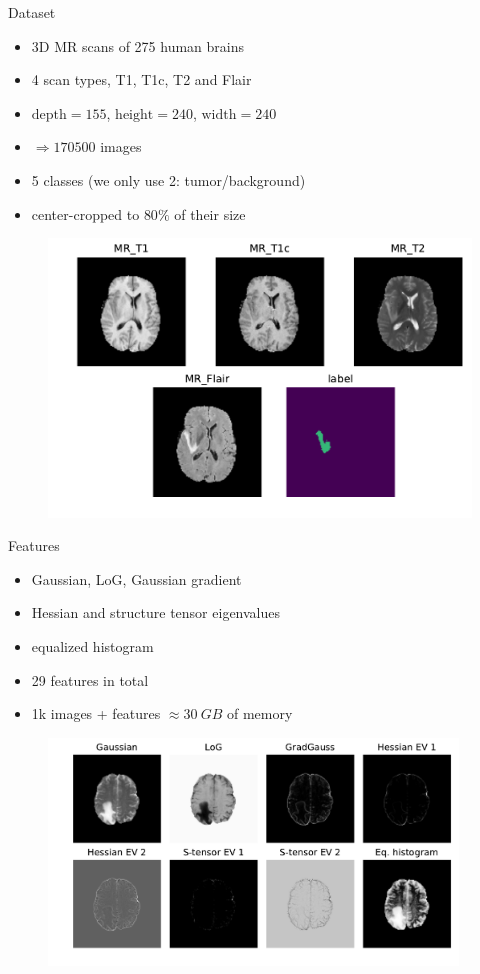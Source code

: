 \documentclass[final]{beamer}
\newlength{\onecolwid}
\begin{document}
\begin{frame}[t]
\begin{columns}[t]
\begin{column}{\onecolwid}
\begin{alertblock}{Dataset}
\begin{itemize}[label={}]
\item 3D MR scans of 275 human brains
\item 4 scan types, T1, T1c, T2 and Flair
\item $\mathrm{depth}=155$, $\mathrm{height}=240$, $\mathrm{width}=240$
\item $\Rightarrow 170500$ images
\item 5 classes (we only use 2: tumor/background)
\item center-cropped to $80\%$ of their size
\end{itemize}
\begin{figure}
\includegraphics[width=0.9\linewidth]{scan_types_trans}
\end{figure}

\end{alertblock}

\begin{block}{Features}
\begin{itemize}[label={}]
\item Gaussian, LoG, Gaussian gradient
\item Hessian and structure tensor eigenvalues
\item equalized histogram
\item 29 features in total
\item 1k images + features $\approx \SI{30}{GB}$ of memory
\end{itemize}
\begin{figure}
\includegraphics[width=0.97\textwidth]{features}
\end{figure}
\end{block}



\end{column}
\end{columns}
\end{frame}
\end{document}
